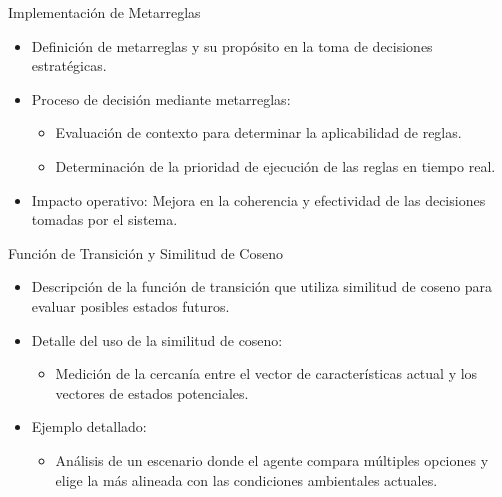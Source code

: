 \documentclass{beamer}
\begin{document}
\begin{frame}{Implementación de Metarreglas}
    \begin{itemize}
        \item Definición de metarreglas y su propósito en la toma de decisiones estratégicas.
        \item Proceso de decisión mediante metarreglas:
              \begin{itemize}
                  \item Evaluación de contexto para determinar la aplicabilidad de reglas.
                  \item Determinación de la prioridad de ejecución de las reglas en tiempo real.
              \end{itemize}
        \item Impacto operativo: Mejora en la coherencia y efectividad de las decisiones tomadas por el sistema.
    \end{itemize}
\end{frame}

\begin{frame}{Función de Transición y Similitud de Coseno}
    \begin{itemize}
        \item Descripción de la función de transición que utiliza similitud de coseno para evaluar posibles estados futuros.
        \item Detalle del uso de la similitud de coseno:
              \begin{itemize}
                  \item Medición de la cercanía entre el vector de características actual y los vectores de estados potenciales.
              \end{itemize}
        \item Ejemplo detallado:
              \begin{itemize}
                  \item Análisis de un escenario donde el agente compara múltiples opciones y elige la más alineada con las condiciones ambientales actuales.
              \end{itemize}
    \end{itemize}
\end{frame}
\end{document}
